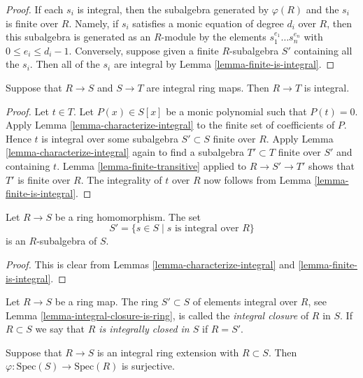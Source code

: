 \begin{proof}
If each $s_i$ is integral, then the subalgebra
generated by $\varphi(R)$ and the $s_i$ is finite
over $R$. Namely, if $s_i$ satisfies a monic equation
of degree $d_i$ over $R$, then this subalgebra is generated as an
$R$-module by the elements $s_1^{e_1} \ldots s_n^{e_n}$
with $0 \leq e_i \leq d_i - 1$.
Conversely, suppose given a finite $R$-subalgebra
$S'$ containing all the $s_i$. Then all of the
$s_i$ are integral by Lemma \ref{lemma-finite-is-integral}.
\end{proof}

\begin{lemma}
\label{lemma-integral-transitive}
Suppose that $R \to S$ and $S \to T$ are integral
ring maps. Then $R \to T$ is integral.
\end{lemma}

\begin{proof}
Let $t \in T$. Let $P(x) \in S[x]$ be a
monic polynomial such that $P(t) = 0$.
Apply Lemma \ref{lemma-characterize-integral}
to the finite set of coefficients of $P$.
Hence $t$ is integral over some subalgebra
$S' \subset S$ finite over $R$. Apply Lemma
\ref{lemma-characterize-integral} again to find
a subalgebra $T' \subset T$ finite over $S'$ and
containing $t$. Lemma \ref{lemma-finite-transitive}
applied to $R \to S' \to T'$ shows that $T'$ is finite
over $R$. The integrality of $t$ over $R$
now follows from Lemma \ref{lemma-finite-is-integral}.
\end{proof}

\begin{lemma}
\label{lemma-integral-closure-is-ring}
Let $R \to S$ be a ring homomorphism.
The set
$$
S' = \{s \in S \mid s\text{ is integral over }R\}
$$
is an $R$-subalgebra of $S$.
\end{lemma}

\begin{proof}
This is clear from Lemmas \ref{lemma-characterize-integral}
and \ref{lemma-finite-is-integral}.
\end{proof}

\begin{definition}
\label{definition-integral-closure}
Let $R \to S$ be a ring map. 
The ring $S' \subset S$ of elements integral over
$R$, see Lemma \ref{lemma-integral-closure-is-ring},
is called the {\it integral closure} of $R$
in $S$. If $R \subset S$ we say that {\it $R$ is
integrally closed in $S$} if $R = S'$.
\end{definition}

\begin{lemma}
\label{lemma-integral-overring-surjective}
Suppose that $R \to S$ is an integral
ring extension with $R \subset S$.
Then $\varphi : \text{Spec}(S) \to \text{Spec}(R)$
is surjective.
\end{lemma}

